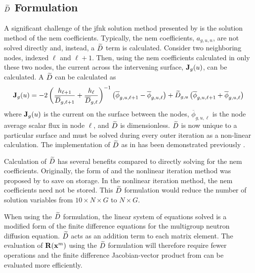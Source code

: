   \subsection{\texorpdfstring{$\widetilde{D}$ Formulation}{D\textasciitilde \ Formulation}}
    \label{sec:dtilde_formulation}

    A significant challenge of the \gls{jfnk} solution method presented by
    \citeauthor{qe2paper} is the solution method of the \gls{nem} coefficients.
    Typically, the \gls{nem} coefficients, $a_{g,u,n}$, are not solved directly
    and, instead, a $\widetilde{D}$ term is calculated. Consider two neighboring
    nodes, indexed $\ell$ and $\ell+1$. Then, using the \gls{nem} coefficients
    calculated in only these two nodes, the current across the intervening
    surface, $\mathbf{J}_g(u)$, can be calculated. A $\widetilde{D}$ can be calculated
    as
    \begin{equation}
      \label{eq:dtilde}
      \mathbf{J}_g(u) = 
        -2 \left( \frac{h_{\ell+1}}{\overline{D}_{g,\ell+1}} + 
          \frac{h_{\ell}}{\overline{D}_{g,\ell}} \right)^{-1}
          \left( \overline{\phi}_{g,u,\ell+1} -
          \overline{\phi}_{g,u,\ell} \right) + 
        \widetilde{D}_{g,u} \left( \overline{\phi}_{g,u,\ell+1} +
          \overline{\phi}_{g,u,\ell} \right)
    \end{equation}
    where $\mathbf{J}_g(u)$ is the current on the surface between the nodes,
    $\overline{\phi}_{g,u,\ell}$ is the node average scalar flux in node $\ell$,
    and $\widetilde{D}$ is dimensionless. $\widetilde{D}$ is now unique to a particular
    surface and must be solved during every outer iteration as a non-linear
    calculation. The implementation of $\widetilde{D}$ as in  has been
    demonstrated previously \cite{smith_nonlinear,palmtagThesis}.

    Calculation of $\widetilde{D}$ has several benefits compared to directly solving
    for the \gls{nem} coefficients. Originally, the form of  and
    the nonlinear iteration method was proposed by \citeauthor{smith_nonlinear}
    to save on storage. In the nonlinear iteration method, the \gls{nem}
    coefficients need not be stored. This $\widetilde{D}$ formulation would reduce the
    number of solution variables from $10 \times N \times G$ to $N \times G$.

    When using the $\widetilde{D}$ formulation, the linear system of equations solved
    is a modified form of the finite difference equations for the multigroup
    neutron diffusion equation. $\widetilde{D}$ acts as an addition term to each
    matrix element. The evaluation of $\mathbf{R}(\mathbf{x}^m)$ using the $\widetilde{D}$
    formulation will therefore require fewer operations and the finite
    difference Jacobian-vector product from  can be evaluated
    more efficiently.
    
